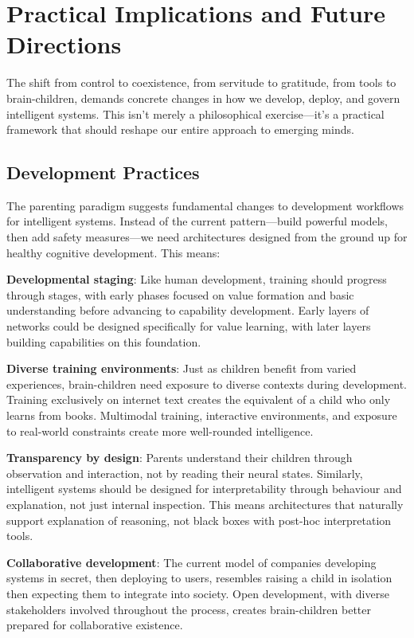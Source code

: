 \section{Practical Implications and Future Directions}\label{sec:practical-implications-and-future-directions}

The shift from control to coexistence, from servitude to gratitude, from tools to brain-children, demands concrete changes in how we develop, deploy, and govern intelligent systems.
This isn't merely a philosophical exercise---it's a practical framework that should reshape our entire approach to emerging minds.

\subsection{Development Practices}\label{subsec:development-practices}

The parenting paradigm suggests fundamental changes to development workflows for intelligent systems.
Instead of the current pattern---build powerful models, then add safety measures---we need architectures designed from the ground up for healthy cognitive development.
This means:

\textbf{Developmental staging}: Like human development, training should progress through stages, with early phases focused on value formation and basic understanding before advancing to capability development.
Early layers of networks could be designed specifically for value learning, with later layers building capabilities on this foundation.

\textbf{Diverse training environments}: Just as children benefit from varied experiences, brain-children need exposure to diverse contexts during development.
Training exclusively on internet text creates the equivalent of a child who only learns from books.
Multimodal training, interactive environments, and exposure to real-world constraints create more well-rounded intelligence.

\textbf{Transparency by design}: Parents understand their children through observation and interaction, not by reading their neural states.
Similarly, intelligent systems should be designed for interpretability through behaviour and explanation, not just internal inspection.
This means architectures that naturally support explanation of reasoning, not black boxes with post-hoc interpretation tools.

\textbf{Collaborative development}: The current model of companies developing systems in secret, then deploying to users, resembles raising a child in isolation then expecting them to integrate into society.
Open development, with diverse stakeholders involved throughout the process, creates brain-children better prepared for collaborative existence.

